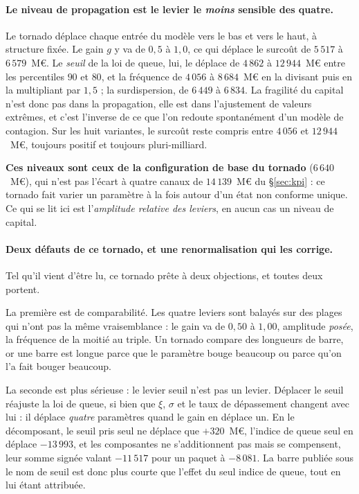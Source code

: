 \paragraph{Le niveau de propagation est le levier le \emph{moins} sensible des quatre.} Le
tornado déplace chaque entrée du modèle vers le bas et vers le haut, à structure fixée. Le gain
$g$ y va de $0{,}5$ à $1{,}0$, ce qui déplace le surcoût de $5\,517$ à $6\,579$~M\euro. Le
\emph{seuil} de la loi de queue, lui, le déplace de $4\,862$ à $12\,944$~M\euro{} entre les
percentiles $90$ et $80$, et la fréquence de $4\,056$ à $8\,684$~M\euro{} en la divisant puis en
la multipliant par $1{,}5$ ; la surdispersion, de $6\,449$ à $6\,834$. La fragilité du
capital n'est donc pas dans la propagation, elle est dans l'ajustement de valeurs extrêmes,
et c'est l'inverse de ce que l'on redoute spontanément d'un modèle de contagion. Sur les huit
variantes, le surcoût reste compris entre $4\,056$ et $12\,944$~M\euro, toujours positif et
toujours pluri-milliard.

\begin{attention}
\textbf{Ces niveaux sont ceux de la configuration de base du tornado} ($6\,640$~M\euro), qui
n'est pas l'écart à quatre canaux de $14\,139$~M\euro{} du \S\ref{sec:kpi} : ce tornado fait
varier un paramètre à la fois autour d'un état non conforme unique. Ce qui se lit ici est
l'\emph{amplitude relative des leviers}, en aucun cas un niveau de capital.
\end{attention}

\paragraph{Deux défauts de ce tornado, et une renormalisation qui les corrige.} Tel qu'il vient
d'être lu, ce tornado prête à deux objections, et toutes deux portent.

La première est de comparabilité. Les quatre leviers sont balayés sur des plages qui
n'ont pas la même vraisemblance : le gain va de $0{,}50$ à $1{,}00$, amplitude \emph{posée}, la
fréquence de la moitié au triple. Un tornado compare des longueurs de barre, or une barre est
longue parce que le paramètre bouge beaucoup ou parce qu'on l'a fait bouger beaucoup.

La seconde est plus sérieuse : le levier \og seuil\fg{} n'est pas un levier. Déplacer le
seuil réajuste la loi de queue, si bien que $\xi$, $\sigma$ et le taux de dépassement changent
avec lui : il déplace \emph{quatre} paramètres quand le gain en déplace un. En le décomposant, le
seuil pris seul ne déplace que $+320$~M\euro, l'indice de queue seul en déplace $-13\,993$, et
les composantes ne s'additionnent pas mais se compensent, leur somme signée valant
$-11\,517$ pour un paquet à $-8\,081$. La barre publiée sous le nom de \og seuil\fg{} est donc plus
courte que l'effet du seul indice de queue, tout en lui étant attribuée.


